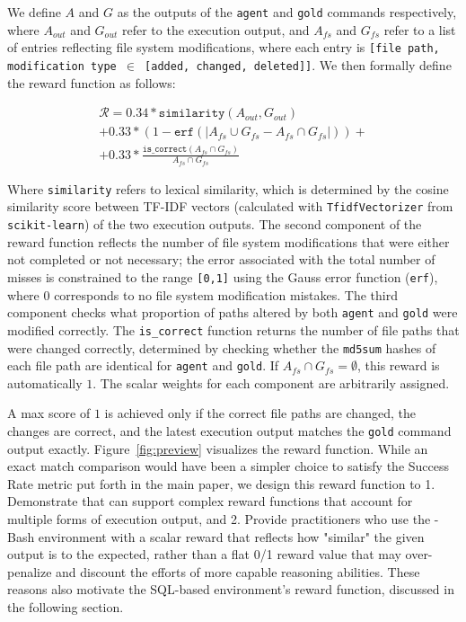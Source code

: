 We define $A$ and $G$ as the outputs of the \texttt{agent} and \texttt{gold} commands respectively, where $A_{out}$ and $G_{out}$ refer to the execution output, and $A_{fs}$ and $G_{fs}$ refer to a list of entries reflecting file system modifications, where each entry is \texttt{[file path, modification type $\in$ [added, changed, deleted]]}. We then formally define the reward function as follows:

\begin{equation}
    \label{eq:reward_bash}
    \begin{gathered}
        \mathcal{R} = 0.34 * \texttt{similarity}(A_{out}, G_{out}) \\
        + 0.33 * (1 - \texttt{erf}(\lvert A_{fs} \cup G_{fs} - A_{fs} \cap G_{fs} \rvert)) + \\
        + 0.33 * \frac{\texttt{is\_correct}(A_{fs} \cap G_{fs})}{A_{fs} \cap G_{fs}}
    \end{gathered}
\end{equation}

Where \texttt{similarity} refers to lexical similarity, which is determined by the cosine similarity score between TF-IDF vectors (calculated with \texttt{TfidfVectorizer} from \texttt{scikit-learn}) of the two execution outputs. The second component of the reward function reflects the number of file system modifications that were either not completed or not necessary; the error associated with the total number of misses is constrained to the range \texttt{[0,1]} using the Gauss error function (\texttt{erf}), where $0$ corresponds to no file system modification mistakes. The third component checks what proportion of paths altered by both \texttt{agent} and \texttt{gold} were modified correctly. The \texttt{is\_correct} function returns the number of file paths that were changed correctly, determined by checking whether the \texttt{md5sum} hashes of each file path are identical for \texttt{agent} and \texttt{gold}. If $A_{fs} \cap G_{fs} = \emptyset$, this reward is automatically $1$. The scalar weights for each component are arbitrarily assigned.

A max score of $1$ is achieved only if the correct file paths are changed, the changes are correct, and the latest execution output matches the \texttt{gold} command output exactly. Figure~\ref{fig:preview} visualizes the reward function.
While an exact match comparison would have been a simpler choice to satisfy the Success Rate metric put forth in the main paper, we design this reward function to 1. Demonstrate that \benchmark{} can support complex reward functions that account for multiple forms of execution output, and 2. Provide practitioners who use the \benchmark{}-Bash environment with a scalar reward that reflects how "similar" the given output is to the expected, rather than a flat 0/1 reward value that may over-penalize and discount the efforts of more capable reasoning abilities. These reasons also motivate the SQL-based environment's reward function, discussed in the following section.

